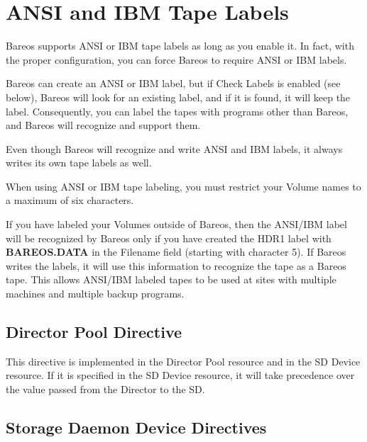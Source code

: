 
\chapter{ANSI and IBM Tape Labels}
\label{AnsiLabelsChapter}

Bareos supports ANSI or IBM tape labels as long as you
enable it.  In fact, with the proper configuration, you can
force Bareos to require ANSI or IBM labels.

Bareos can create an ANSI or IBM label, but if Check Labels is
enabled (see below), Bareos will look for an existing label, and
if it is found, it will keep the label. Consequently, you
can label the tapes with programs other than Bareos, and Bareos
will recognize and support them.

Even though Bareos will recognize and write ANSI and IBM labels,
it always writes its own tape labels as well.

When using ANSI or IBM tape labeling, you must restrict your Volume
names to a maximum of six characters.

If you have labeled your Volumes outside of Bareos, then the
ANSI/IBM label will be recognized by Bareos only if you have created
the HDR1 label with {\bf BAREOS.DATA} in the Filename field (starting
with character 5).  If Bareos writes the labels, it will use
this information to recognize the tape as a Bareos tape.  This allows
ANSI/IBM labeled tapes to be used at sites with multiple machines
and multiple backup programs.


\section{Director Pool Directive}

\begin{description}
  This directive is implemented in the Director Pool resource and in the SD Device
  resource.  If it is specified in the SD Device resource, it will take
  precedence over the value passed from the Director to the SD.
\end{description}

\section{Storage Daemon Device Directives}

